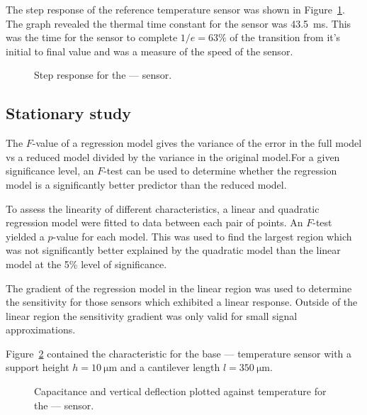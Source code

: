 \documentclass[a4paper,10pt,twocolumn]{article}
\begin{document}
The step response of the reference temperature sensor was shown in 
Figure~\ref{fig:response}. The graph revealed the thermal time constant for
the sensor was \SI{43.5}{\milli\second}. This was the time for the sensor to
complete $1/e=63\%$ of the transition from it's initial to final value and was a
measure of the speed of the sensor.

\begin{figure}[h]
    \centering
    \begin{footnotesize}
        
    \end{footnotesize}
    \caption{Step response for the ---- sensor.}
    \label{fig:response}
\end{figure}


\subsection{Stationary study}

The $F$-value of a regression model gives the variance of the error in the full
model vs a reduced model divided by the variance in the original model.For a
given significance level, an $F$-test can be used to determine whether the
regression model is a significantly better predictor than the reduced model.

To assess the linearity of different characteristics, a linear and quadratic
regression model were fitted to data between each pair of points. An $F$-test
yielded a $p$-value for each model. This was used to find the largest region
which was not significantly better explained by the quadratic model than the
linear model at the 5\% level of significance.

The gradient of the regression model in the linear region was used to determine
the sensitivity for those sensors which exhibited a linear response. Outside of
the linear region the sensitivity gradient was only valid for small signal
approximations.

Figure~\ref{fig:basic} contained the characteristic for the base
---- temperature sensor with a support height
$h=\SI{10}{\micro\meter}$ and a cantilever length $l=\SI{350}{\micro\meter}$.

\begin{figure}[h]
    \centering
    \begin{footnotesize}
        
        \vspace{-4em}
        
    \end{footnotesize}
    \caption{Capacitance and vertical deflection plotted against temperature
    for the ---- sensor.}
    \label{fig:basic}
\end{figure}
\end{document}
